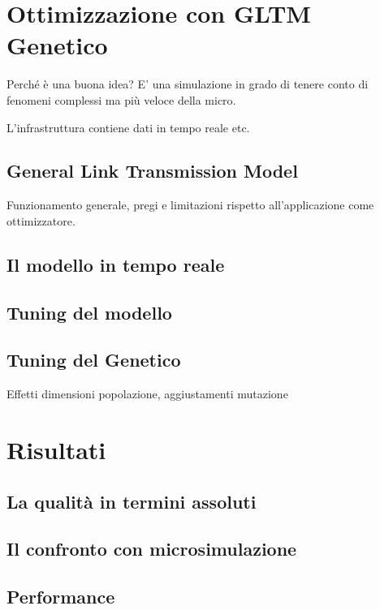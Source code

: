 \documentclass[10pt,a4paper,twoside]{book}
\begin{document}
\chapter{Ottimizzazione con GLTM Genetico}
Perché è una buona idea?
E' una simulazione in grado di tenere conto di fenomeni complessi ma più veloce della micro.

L'infrastruttura contiene dati in tempo reale etc.

\section{General Link Transmission Model}
Funzionamento generale, pregi e limitazioni rispetto all'applicazione come ottimizzatore.


\section{Il modello in tempo reale}

\section{Tuning del modello}


\section{Tuning del Genetico}
Effetti dimensioni popolazione, aggiustamenti mutazione

\chapter{Risultati}
\section{La qualità in termini assoluti}


\section{Il confronto con microsimulazione}


\section{Performance}
\end{document}
